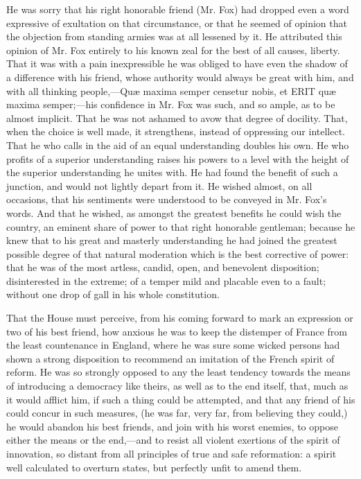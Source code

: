 He was sorry that his right honorable friend (Mr. Fox) had dropped even a word expressive of exultation on that circumstance, or that he seemed of opinion that the objection from standing armies was at all lessened by it. He attributed this opinion of Mr. Fox entirely to his known zeal for the best of all causes, liberty. That it was with a pain inexpressible he was obliged to have even the shadow of a difference with his friend, whose authority would always be great with him, and with all thinking people,—Quæ maxima semper censetur nobis, et ERIT quæ maxima semper;—his confidence in Mr. Fox was such, and so ample, as to be almost implicit. That he was not ashamed to avow that degree of docility. That, when the choice is well made, it strengthens, instead of oppressing our intellect. That he who calls in the aid of an equal understanding doubles his own. He who profits of a superior understanding raises his powers to a level with the height of the superior understanding he unites with. He had found the benefit of such a junction, and would not lightly depart from it. He wished almost, on all occasions, that his sentiments were understood to be conveyed in Mr. Fox's words. And that he wished, as amongst the greatest benefits he could wish the country, an eminent share of power to that right honorable gentleman; because he knew that to his great and masterly understanding he had joined the greatest possible degree of that natural moderation which is the best corrective of power: that he was of the most artless, candid, open, and benevolent disposition; disinterested in the extreme; of a temper mild and placable even to a fault; without one drop of gall in his whole constitution.

That the House must perceive, from his coming forward to mark an expression or two of his best friend, how anxious he was to keep the distemper of France from the least countenance in England, where he was sure some wicked persons had shown a strong disposition to recommend an imitation of the French spirit of reform. He was so strongly opposed to any the least tendency towards the means of introducing a democracy like theirs, as well as to the end itself, that, much as it would afflict him, if such a thing could be attempted, and that any friend of his could concur in such measures, (he was far, very far, from believing they could,) he would abandon his best friends, and join with his worst enemies, to oppose either the means or the end,—and to resist all violent exertions of the spirit of innovation, so distant from all principles of true and safe reformation: a spirit well calculated to overturn states, but perfectly unfit to amend them.

